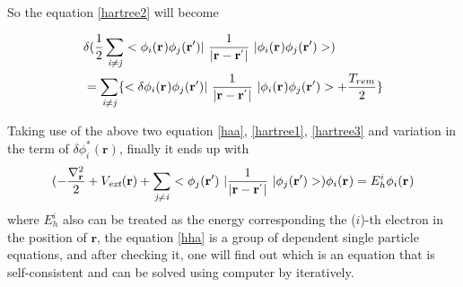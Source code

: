 \documentclass[a4paper, 12pt, titlepage,oneside,drop]{kthesis}
\begin{document}
\noindent So the equation \ref{hartree2} will become 

\begin{equation}\begin{split}\label{hartree3}
&  \delta( \frac{1}{2} \suminj<i><j> <\bwf<i><> \bwfn<j><'>|\ \frac{1}{|\textbf{r} - \textbf{r}^{'} |} \ | \bwf<i><> \bwfn<j><'>>)   \\
& =  \suminj<i><j> \{  <\delta \bwf<i><> \bwfn<j><'>|\ \frac{1}{|\textbf{r} - \textbf{r}^{'} |} \ | \bwf<i><> \bwfn<j><'>> + \frac{T_{rem}}{2}\}
\end{split}\end{equation}


Taking use of the above two equation \ref{haa}, \ref{hartree1}, \ref{hartree3} and variation in the term of  $\delta \phi^{*}_{i}(\textbf{r}{}) $,
finally it ends up with
\begin{equation}\label{hha}
(-\frac{\nabla^{2}_{\textbf r}}{2} + V_\textit{ext}(\textbf{r})+ \suminj<j><i> <\bwfn<j><'>\ | \frac{1}{|\textbf{r} - \textbf{r}^{'} |} \ | \bwfn<j><'>>) \bwf<i><> = E^{i}_{h} \bwf<i><>
\end{equation}
\noindent where $E^{i}_{h}$  also can be treated as the energy corresponding the ($i$)-th electron in the position of  $\textbf{r}$, the equation \ref{hha} is a group of dependent single
 particle equations, and after checking it, one will find out which is an equation that is self-consistent and can be solved using computer by iteratively.

\end{document}
